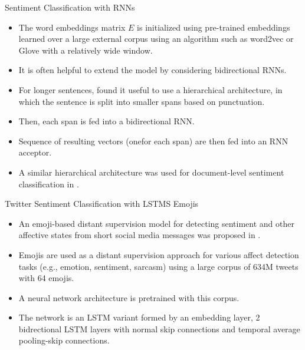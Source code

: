\documentclass[handout]{beamer}
\begin{document}
\begin{frame}{Sentiment Classification with RNNs}
\begin{scriptsize}
\begin{itemize}
\item The word embeddings matrix $E$ is initialized using pre-trained embeddings learned over a large external corpus using an algorithm such as word2vec or Glove with a relatively wide window.
\item It is often helpful to extend the model by considering bidirectional RNNs.
\item For longer sentences, \cite{li2015tree} found it useful to use a hierarchical architecture, in which the sentence is split into smaller spans based on punctuation.
\item Then, each span is fed into a bidirectional RNN. 
\item Sequence of resulting vectors (onefor each span) are then fed into an RNN acceptor.
\item A similar hierarchical architecture was used for document-level sentiment classification in \cite{tang2015document}.
\end{itemize}
\end{scriptsize}
\end{frame}



\begin{frame}{Twitter Sentiment Classification with LSTMS Emojis}
\begin{scriptsize}
\begin{itemize}
\item An emoji-based distant supervision model for detecting sentiment and other affective states from short social media messages was proposed in \cite{FelboMSRL17}.
\item Emojis are used as a distant supervision approach for various affect detection tasks (e.g., emotion, sentiment, sarcasm) using a large corpus of 634M tweets with 64 emojis.
\item A neural network architecture is pretrained with this corpus. 
\item The network is an LSTM variant formed by an embedding layer, 2 bidrectional LSTM layers with normal skip connections and temporal average pooling-skip connections.
\end{itemize}
\end{scriptsize}
\end{frame}
\end{document}
